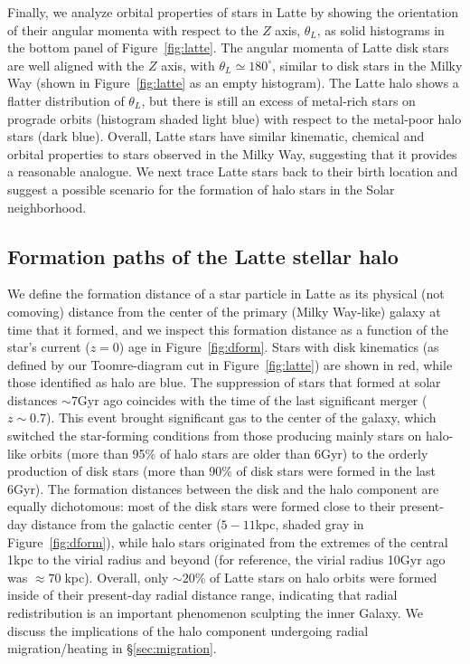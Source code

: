 \documentclass[apj, twocolappendix, numberedappendix, appendixfloats]{emulateapj}
\begin{document}
Finally, we analyze orbital properties of stars in Latte by showing the orientation of their angular momenta with respect to the $Z$ axis, $\theta_L$, as solid histograms in the bottom panel of Figure~\ref{fig:latte}.
The angular momenta of Latte disk stars are well aligned with the $Z$ axis, with $\theta_L\simeq180^\circ$, similar to disk stars in the Milky Way (shown in Figure~\ref{fig:latte} as an empty histogram).
The Latte halo shows a flatter distribution of $\theta_L$, but there is still an excess of metal-rich stars on prograde orbits (histogram shaded light blue) with respect to the metal-poor halo stars (dark blue).
Overall, Latte stars have similar kinematic, chemical and orbital properties to stars observed in the Milky Way, suggesting that it provides a reasonable analogue.
We next trace Latte stars back to their birth location and suggest a possible scenario for the formation of halo stars in the Solar neighborhood.

\subsection{Formation paths of the Latte stellar halo}
\label{sec:formation}
We define the formation distance of a star particle in Latte as its physical (not comoving) distance from the center of the primary (Milky Way-like) galaxy at time that it formed, and we inspect this formation distance as a function of the star's current ($z = 0$) age in Figure~\ref{fig:dform}.
Stars with disk kinematics (as defined by our Toomre-diagram cut in Figure~\ref{fig:latte}) are shown in red, while those identified as halo are blue.
The suppression of stars that formed at solar distances $\sim$7\;Gyr ago coincides with the time of the last significant merger ($z\sim0.7$).
This event brought significant gas to the center of the galaxy, which switched the star-forming conditions from those producing mainly stars on halo-like orbits (more than 95\% of halo stars are older than 6\;Gyr) to the orderly production of disk stars (more than 90\% of disk stars were formed in the last 6\;Gyr).
The formation distances between the disk and the halo component are equally dichotomous: most of the disk stars were formed close to their present-day distance from the galactic center ($5-11$\;kpc, shaded gray in Figure~\ref{fig:dform}), while halo stars originated from the extremes of the central 1\;kpc to the virial radius and beyond (for reference, the virial radius 10\;Gyr ago was $\approx70\;$kpc).
Overall, only $\sim20$\% of Latte stars on halo orbits were formed inside of their present-day radial distance range, indicating that radial redistribution is an important phenomenon sculpting the inner Galaxy.
We discuss the implications of the halo component undergoing radial migration/heating in \S\ref{sec:migration}.
\end{document}
